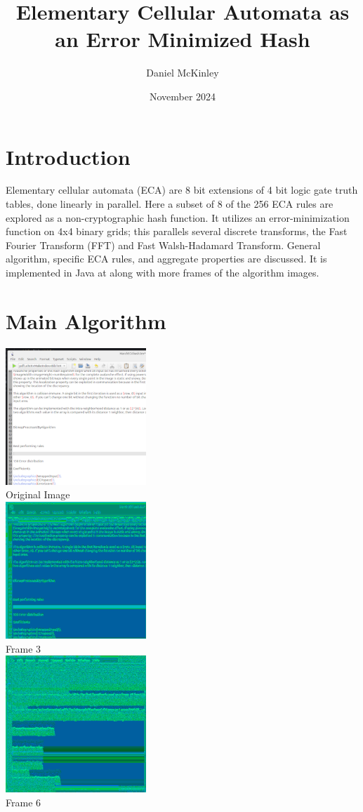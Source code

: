 \documentclass[11pt]{article}
\title{Elementary Cellular Automata as an Error Minimized Hash}
\date{November 2024}
\author{Daniel McKinley}
\begin{document}
\maketitle

\section{Introduction}

Elementary cellular automata (ECA) are 8 bit extensions of 4 bit logic gate truth tables, done linearly in parallel. \cite{Wolfram}
Here a subset of 8 of the 256 ECA rules are explored as a non-cryptographic hash function. It utilizes an error-minimization function on 4x4 binary grids; this parallels several discrete transforms, the Fast Fourier Transform (FFT) and Fast Walsh-Hadamard Transform. General algorithm, specific ECA rules, and aggregate properties are discussed. It is implemented in Java at \cite{mygit} along with more frames of the algorithm images. \\
\section{Main Algorithm}

\begin{center}
\includegraphics{testScreenshot}\\
Original Image\\
\includegraphics{processedDepth3}\\
Frame 3\\
\includegraphics{processedDepth6}\\
Frame 6\\
\end{center}
\end{document}
